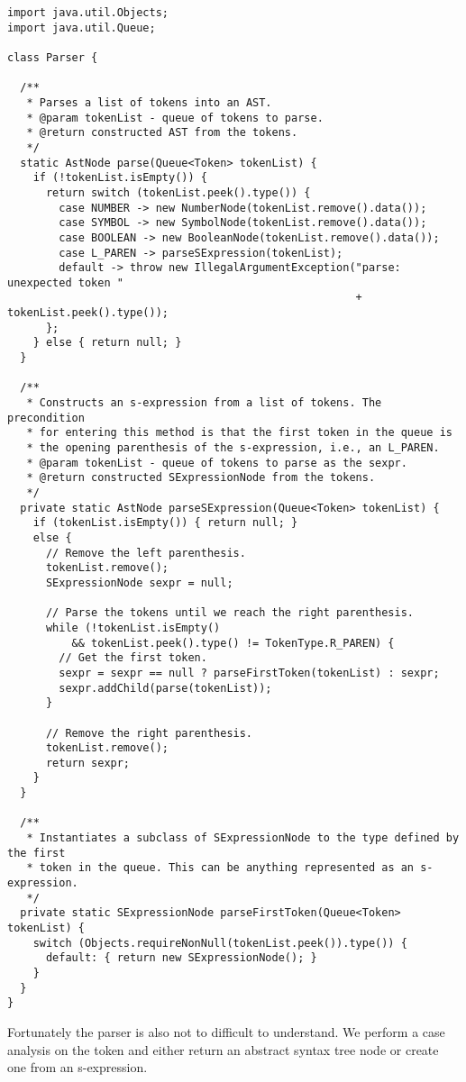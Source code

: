 \begin{lstlisting}[language=MyJava]
import java.util.Objects;
import java.util.Queue;

class Parser {

  /**
   * Parses a list of tokens into an AST.
   * @param tokenList - queue of tokens to parse.
   * @return constructed AST from the tokens.
   */
  static AstNode parse(Queue<Token> tokenList) {
    if (!tokenList.isEmpty()) {
      return switch (tokenList.peek().type()) {
        case NUMBER -> new NumberNode(tokenList.remove().data());
        case SYMBOL -> new SymbolNode(tokenList.remove().data());
        case BOOLEAN -> new BooleanNode(tokenList.remove().data());
        case L_PAREN -> parseSExpression(tokenList);
        default -> throw new IllegalArgumentException("parse: unexpected token " 
                                                      + tokenList.peek().type());
      };
    } else { return null; }
  }

  /**
   * Constructs an s-expression from a list of tokens. The precondition
   * for entering this method is that the first token in the queue is
   * the opening parenthesis of the s-expression, i.e., an L_PAREN.
   * @param tokenList - queue of tokens to parse as the sexpr.
   * @return constructed SExpressionNode from the tokens.
   */
  private static AstNode parseSExpression(Queue<Token> tokenList) {
    if (tokenList.isEmpty()) { return null; }
    else {
      // Remove the left parenthesis.
      tokenList.remove();
      SExpressionNode sexpr = null;

      // Parse the tokens until we reach the right parenthesis.
      while (!tokenList.isEmpty() 
          && tokenList.peek().type() != TokenType.R_PAREN) {
        // Get the first token.
        sexpr = sexpr == null ? parseFirstToken(tokenList) : sexpr;
        sexpr.addChild(parse(tokenList));
      }

      // Remove the right parenthesis.
      tokenList.remove();
      return sexpr;
    }
  }

  /**
   * Instantiates a subclass of SExpressionNode to the type defined by the first
   * token in the queue. This can be anything represented as an s-expression.
   */
  private static SExpressionNode parseFirstToken(Queue<Token> tokenList) {
    switch (Objects.requireNonNull(tokenList.peek()).type()) {
      default: { return new SExpressionNode(); }
    }
  }
}
\end{lstlisting}

Fortunately the parser is also not to difficult to understand. We perform a case analysis on the token and either return an abstract syntax tree node or create one from an s-expression.

